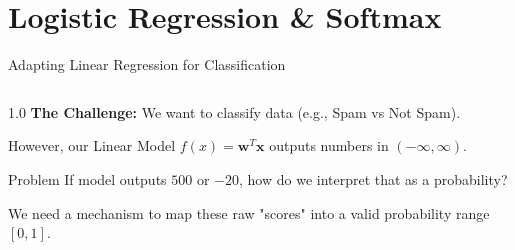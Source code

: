 \section{Logistic Regression \& Softmax}
\begin{frame}{Adapting Linear Regression for Classification}
    \begin{columns}[c]
        \begin{column}{1.0\textwidth}
            \textbf{The Challenge:}
            We want to classify data (e.g., Spam vs Not Spam).
            
            \vspace{1em}
            However, our Linear Model $f(x) = \mathbf{w}^T\mathbf{x}$ outputs numbers in $(-\infty, \infty)$.
            
            \vspace{1em}
            \begin{exampleblock}{Problem}
                If model outputs $500$ or $-20$, how do we interpret that as a probability?
            \end{exampleblock}
            
            \vspace{1em}
            We need a mechanism to map these raw "scores" into a valid probability range $[0, 1]$.
        \end{column}
    \end{columns}
\end{frame}



